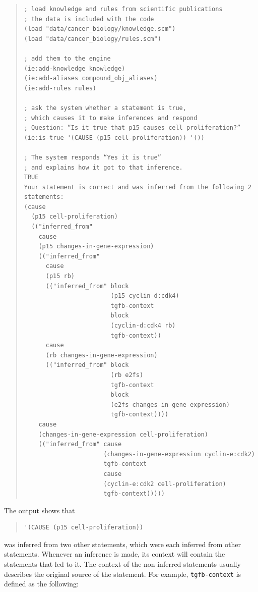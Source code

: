 \documentclass[11pt]{article}
\begin{document}
\begin{quote}
\begin{verbatim}
; load knowledge and rules from scientific publications
; the data is included with the code
(load "data/cancer_biology/knowledge.scm")
(load "data/cancer_biology/rules.scm")

; add them to the engine
(ie:add-knowledge knowledge)
(ie:add-aliases compound_obj_aliases)
(ie:add-rules rules)

; ask the system whether a statement is true,
; which causes it to make inferences and respond
; Question: “Is it true that p15 causes cell proliferation?”
(ie:is-true '(CAUSE (p15 cell-proliferation)) '())

; The system responds “Yes it is true”
; and explains how it got to that inference.
TRUE
Your statement is correct and was inferred from the following 2 statements:
(cause
  (p15 cell-proliferation)
  (("inferred_from"
    cause
    (p15 changes-in-gene-expression)
    (("inferred_from"
      cause
      (p15 rb)
      (("inferred_from" block
                        (p15 cyclin-d:cdk4)
                        tgfb-context
                        block
                        (cyclin-d:cdk4 rb)
                        tgfb-context))
      cause
      (rb changes-in-gene-expression)
      (("inferred_from" block
                        (rb e2fs)
                        tgfb-context
                        block
                        (e2fs changes-in-gene-expression)
                        tgfb-context))))
    cause
    (changes-in-gene-expression cell-proliferation)
    (("inferred_from" cause
                      (changes-in-gene-expression cyclin-e:cdk2)
                      tgfb-context
                      cause
                      (cyclin-e:cdk2 cell-proliferation)
                      tgfb-context)))))
\end{verbatim}
\end{quote}

The output shows that

\begin{quote}
\begin{verbatim}
'(CAUSE (p15 cell-proliferation))
\end{verbatim}
\end{quote}

was inferred from two other statements, which were each inferred from other statements. Whenever an inference is made, its context will contain the statements that led to it. The context of the non-inferred statements usually describes the original source of the statement. For example, \texttt{tgfb-context} is defined as the following:
\end{document}
